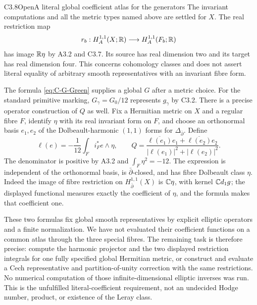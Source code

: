 \begin{claim}{C3.8}{Open}{A literal global coefficient atlas for the generators}
The invariant computations and all the metric types named above are
settled for $X$.  The real restriction map
\[
r_b:H_A^{1,1}(X;\mathbb R)\longrightarrow H_A^{1,1}(F_b;\mathbb R)
\]
has image $\mathbb R\eta$ by A3.2 and C3.7.  Its source has real dimension
two and its target has real dimension four.  This concerns
cohomology classes and does not assert literal equality of arbitrary
smooth representatives with an invariant fibre form.

The formula \eqref{eq:C-G-Green} supplies a global $G$ after a metric
choice.  For the standard primitive marking, $G_\gamma=G_0/12$
represents $g_\gamma$ by C3.2.  There is a precise operator
construction of $Q$ as well.  Fix a Hermitian metric on $X$ and a
regular fibre $F$, identify $\eta$ with its real invariant form on
$F$, and choose an orthonormal basis $e_1,e_2$ of the Dolbeault-harmonic
$(1,1)$ forms for $\Delta_{\bar\partial}$.  Define
\[
\ell(e)=-\frac1{12}\int_F i_F^*e\wedge\eta,\qquad
Q=\frac{\overline{\ell(e_1)}e_1+
            \overline{\ell(e_2)}e_2}
          {|\ell(e_1)|^2+|\ell(e_2)|^2}.
\]
The denominator is positive by A3.2 and
$\int_F\eta^2=-12$.  The expression is independent of the
orthonormal basis, is $\bar\partial$-closed, and has fibre
Dolbeault class $\eta$.  Indeed the image of fibre restriction on
$H^{1,1}_{\bar\partial}(X)$ is $\mathbb C\eta$, with kernel
$\mathbb C d_1g$; the displayed functional measures exactly the coefficient
of $\eta$, and the formula makes that coefficient one.

These two formulas fix global smooth representatives by explicit
elliptic operators and a finite normalization.  We have not evaluated
their coefficient functions on a common atlas through the three
special fibres.  The remaining task is therefore precise: compute
the harmonic projector and the two displayed restriction integrals
for one fully specified global Hermitian metric, or construct and
evaluate a Cech representative and partition-of-unity correction
with the same restrictions.  No numerical computation of those
infinite-dimensional elliptic inverses was run.  This is the
unfulfilled literal-coefficient requirement, not an undecided Hodge
number, product, or existence of the Leray class.
\end{claim}

